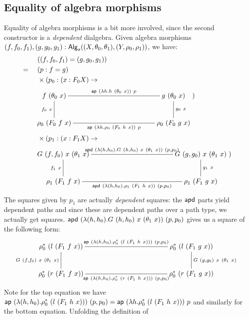 \documentclass[a4paper,10pt]{report}
\begin{document}
\subsection{Equality of algebra morphisms}
Equality of algebra morphisms is a bit more involved, since the second
constructor is a \emph{dependent} dialgebra. Given algebra morphisms
$(f,f_0,f_1), (g,g_0,g_1) :
\mathsf{Alg}_s((X,\theta_0,\theta_1),(Y,\rho_0,\rho_1))$, we have:
%
\begin{align*}
  & &&\ ((f,f_0,f_1) = (g,g_0,g_1)) \\
  &=&&\ (p : f = g) \\
  & &&\ \times (p_0 : (x : F_0 X) \to \\
  & &&
  \xymatrixcolsep{10pc}
  \xymatrix{
    f\ (\theta_0\ x) \ar@{-}[d]_{f_0\ x} \ar@{-}[r]^{\ap\ (\lambda h . h\ (\theta_0\ x))\ p}  &g\ (\theta_0\ x) \ar@{-}[d]^{g_0\ x} \\
    \rho_0\ (F_0\ f\ x) \ar@{-}[r]_{\ap\ (\lambda h . \rho_0\ (F_0\ h\ x))\ p} &\rho_0\ (F_0\ g\ x)
  }) \\
  & &&\ \times (p_1 : (x : F_1 X) \to \\
  & &&
  \xymatrixcolsep{10pc}
  \xymatrix{
    G\ (f,f_0)\ x\ (\theta_1\ x) \ar@{-}[d]_{f_1\ x} \ar@{-}[r]^{\apd\ (\lambda (h,h_0) . G\ (h,h_0)\ x\ (\theta_1\ x))\ (p,p_0)}  &G\ (g,g_0)\ x\ (\theta_1\ x) \ar@{-}[d]^{g_1\ x} \\
    \rho_1\ (F_1\ f\ x) \ar@{-}[r]_{\apd\ (\lambda (h,h_0) . \rho_1\ (F_1\ h\ x))\ (p,p_0)} &\rho_1\ (F_1\ g\ x)
  }) \\
\end{align*}
%
The squares given by $p_1$ are actually \emph{dependent} squares: the
$\mathsf{apd}$ parts yield dependent paths and since these are dependent paths
over a path type, we actually get squares.
$\apd\ (\lambda (h,h_0) . G\ (h,h_0)\ x\ (\theta_1\ x))\ (p,p_0)$
gives us a square of the following form:
$$
\xymatrixcolsep{10pc}
\xymatrix{
  \rho_0^*\ (l\ (F_1\ f\ x))
  \ar@{-}[d]_{G\ (f,f_0)\ x\ (\theta_1\ x)}
  \ar@{-}[r]^{\ap\ (\lambda (h,h_0) . \rho_0^*\ (l\ (F_1\ h\ x)))\ (p,p_0)}
  &\rho_0^*\ (l\ (F_1\ g\ x)) 
  \\
  \rho_0^*\ (r\ (F_1\ f\ x))
  &\rho_0^*\ (r\ (F_1\ g\ x)) 
  \ar@{-}[l]^{\ap\ (\lambda (h,h_0) . \rho_0^*\ (r\ (F_1\ h\ x)))\ (p,p_0)}
  \ar@{-}[u]_{G\ (g,g_0)\ x\ (\theta_1\ x)}
  \\
}
$$
Note for the top equation we have
$\ap\ (\lambda (h,h_0) . \rho_0^*\ (l\ (F_1\ h\ x)))\ (p,p_0) = \ap\
(\lambda h . \rho_0^*\ (l\ (F_1\ h\ x)))\ p$
and similarly for the bottom equation. Unfolding the definition of
\end{document}
